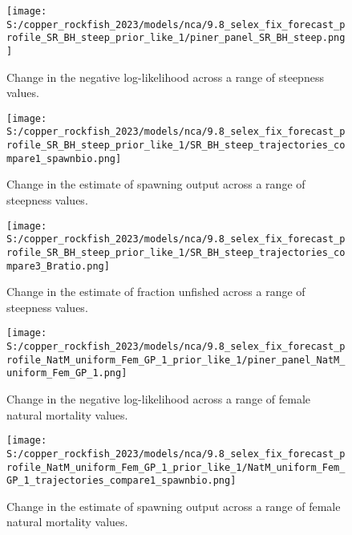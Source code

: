 \documentclass[11pt,
  english,
  letterpaper,
]{article}
\begin{document}
\pagebreak

\begin{figure}
\centering
\texttt{[image: S:/copper\_rockfish\_2023/models/nca/9.8\_selex\_fix\_forecast\_profile\_SR\_BH\_steep\_prior\_like\_1/piner\_panel\_SR\_BH\_steep.png]}
\caption{Change in the negative log-likelihood across a range of steepness values.\label{fig:h-profile}}
\end{figure}

\pagebreak

\begin{figure}
\centering
\texttt{[image: S:/copper\_rockfish\_2023/models/nca/9.8\_selex\_fix\_forecast\_profile\_SR\_BH\_steep\_prior\_like\_1/SR\_BH\_steep\_trajectories\_compare1\_spawnbio.png]}
\caption{Change in the estimate of spawning output across a range of steepness values.\label{fig:h-ssb}}
\end{figure}

\pagebreak

\begin{figure}
\centering
\texttt{[image: S:/copper\_rockfish\_2023/models/nca/9.8\_selex\_fix\_forecast\_profile\_SR\_BH\_steep\_prior\_like\_1/SR\_BH\_steep\_trajectories\_compare3\_Bratio.png]}
\caption{Change in the estimate of fraction unfished across a range of steepness values.\label{fig:h-depl}}
\end{figure}

\pagebreak

\begin{figure}
\centering
\texttt{[image: S:/copper\_rockfish\_2023/models/nca/9.8\_selex\_fix\_forecast\_profile\_NatM\_uniform\_Fem\_GP\_1\_prior\_like\_1/piner\_panel\_NatM\_uniform\_Fem\_GP\_1.png]}
\caption{Change in the negative log-likelihood across a range of female natural mortality values.\label{fig:m-profile}}
\end{figure}

\pagebreak

\begin{figure}
\centering
\texttt{[image: S:/copper\_rockfish\_2023/models/nca/9.8\_selex\_fix\_forecast\_profile\_NatM\_uniform\_Fem\_GP\_1\_prior\_like\_1/NatM\_uniform\_Fem\_GP\_1\_trajectories\_compare1\_spawnbio.png]}
\caption{Change in the estimate of spawning output across a range of female natural mortality values.\label{fig:m-ssb}}
\end{figure}

\pagebreak
\end{document}
